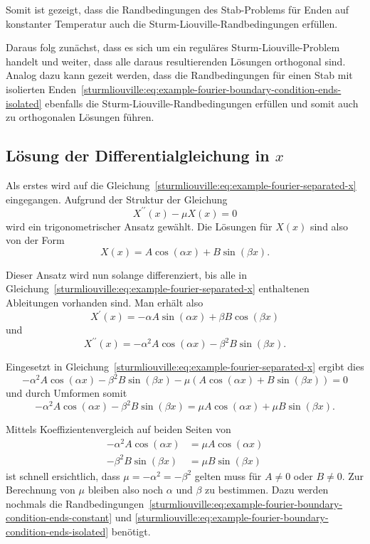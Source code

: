 Somit ist gezeigt, dass die Randbedingungen des Stab-Problems für Enden auf
konstanter Temperatur auch die Sturm-Liouville-Randbedingungen erfüllen.

Daraus folg zunächst, dass es sich um ein reguläres Sturm-Liouville-Problem
handelt und weiter, dass alle daraus resultierenden Lösungen orthogonal sind.
Analog dazu kann gezeit werden, dass die Randbedingungen für einen Stab mit
isolierten
Enden~\eqref{sturmliouville:eq:example-fourier-boundary-condition-ends-isolated}
ebenfalls die Sturm-Liouville-Randbedingungen erfüllen und
somit auch zu orthogonalen Lösungen führen.

%
%

\subsection{Lösung der Differentialgleichung in \texorpdfstring{$x$}{x}}
Als erstes wird auf die
Gleichung~\eqref{sturmliouville:eq:example-fourier-separated-x} eingegangen.
Aufgrund der Struktur der Gleichung
\[
    X^{\prime \prime}(x) - \mu X(x)
    =
    0
\]
wird ein trigonometrischer Ansatz gewählt.
Die Lösungen für $X(x)$ sind also von der Form
\[
    X(x)
    =
    A \cos \left( \alpha x\right) + B \sin \left( \beta x\right).
\]

Dieser Ansatz wird nun solange differenziert, bis alle in
Gleichung~\eqref{sturmliouville:eq:example-fourier-separated-x} enthaltenen
Ableitungen vorhanden sind.
Man erhält also
\[
    X^{\prime}(x)
    =
    - \alpha A \sin \left( \alpha x \right) +
    \beta B \cos \left( \beta x \right)
\]
und
\[
    X^{\prime \prime}(x)
    =
    -\alpha^{2} A \cos \left( \alpha x \right) -
    \beta^{2} B \sin \left( \beta x \right).
\]

Eingesetzt in Gleichung~\eqref{sturmliouville:eq:example-fourier-separated-x}
ergibt dies
\[
    -\alpha^{2}A\cos(\alpha x) - \beta^{2}B\sin(\beta x) -
    \mu\left(A\cos(\alpha x) + B\sin(\beta x)\right)
    =
    0
\]
und durch Umformen somit
\[
    -\alpha^{2}A\cos(\alpha x) - \beta^{2}B\sin(\beta x)
    =
    \mu A\cos(\alpha x) + \mu B\sin(\beta x).
\]

Mittels Koeffizientenvergleich auf beiden Seiten von
\[
\begin{aligned}
    -\alpha^{2}A\cos(\alpha x)
    &=
    \mu A\cos(\alpha x)
    \\
    -\beta^{2}B\sin(\beta x)
    &=
    \mu B\sin(\beta x)
\end{aligned}
\]
ist schnell ersichtlich, dass $ \mu = -\alpha^{2} = -\beta^{2} $ gelten muss für
$ A \neq 0 $ oder $ B \neq 0 $.
Zur Berechnung von $ \mu $ bleiben also noch  $ \alpha $ und $ \beta $ zu
bestimmen.
Dazu werden nochmals die
Randbedingungen~\eqref{sturmliouville:eq:example-fourier-boundary-condition-ends-constant} 
und \eqref{sturmliouville:eq:example-fourier-boundary-condition-ends-isolated}
benötigt.

